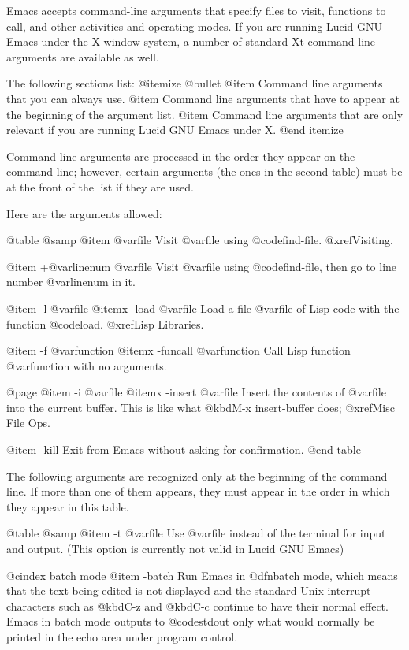 {{  Emacs accepts command-line arguments that specify files to visit,
functions to call, and other activities and operating modes.  If you are
running Lucid GNU Emacs under the X window system, a number of standard
Xt command line arguments are available as well. 

The following sections list:
@itemize @bullet
@item 
Command line arguments that you can always use.
@item 
Command line arguments that have to appear at the beginning of the
argument list.
@item
Command line arguments that are only relevant if you are running Lucid
GNU Emacs under X.
@end itemize

 Command line arguments are processed in the order they appear on the
command line; however, certain arguments (the ones in the
second table) must be at the front of the list if they are used.

  Here are the arguments allowed:

@table @samp
@item @var{file}
Visit @var{file} using @code{find-file}.  @xref{Visiting}.

@item +@var{linenum} @var{file}
Visit @var{file} using @code{find-file}, then go to line number
@var{linenum} in it.

@item -l @var{file}
@itemx -load @var{file}
Load a file @var{file} of Lisp code with the function @code{load}.
@xref{Lisp Libraries}.

@item -f @var{function}
@itemx -funcall @var{function}
Call Lisp function @var{function} with no arguments.

@page
@item -i @var{file}
@itemx -insert @var{file}
Insert the contents of @var{file} into the current buffer.  This is like
what @kbd{M-x insert-buffer} does; @xref{Misc File Ops}.

@item -kill
Exit from Emacs without asking for confirmation.
@end table

  The following arguments are recognized only at the beginning of the
command line.  If more than one of them appears, they must appear in the
order in which they appear in this table.

@table @samp
@item -t @var{file}
Use @var{file} instead of the terminal for input and output. (This
option is currently not valid in Lucid GNU Emacs)

@cindex batch mode
@item -batch
Run Emacs in @dfn{batch mode}, which means that the text being edited is
not displayed and the standard Unix interrupt characters such as
@kbd{C-z} and @kbd{C-c} continue to have their normal effect.  Emacs in
batch mode outputs to @code{stdout} only what would normally be printed
in the echo area under program control.

}}
